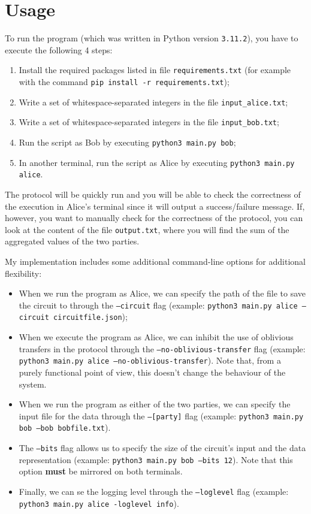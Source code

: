 \documentclass[12pt]{article}
\begin{document}
\section{Usage}\label{sec:running}

To run the program (which was written in Python version \texttt{3.11.2}), you have to execute the following 4 steps:

\begin{enumerate}
  \item Install the required packages listed in file \texttt{requirements.txt} (for example with the command \texttt{pip install -r requirements.txt});
  \item Write a set of whitespace-separated integers in the file \texttt{input\_alice.txt};
  \item Write a set of whitespace-separated integers in the file \texttt{input\_bob.txt};
  \item Run the script as Bob by executing \texttt{python3 main.py bob};
  \item In another terminal, run the script as Alice by executing \texttt{python3 main.py alice}.
\end{enumerate}

The protocol will be quickly run and you will be able to check the correctness of the execution in Alice's terminal since it will output a success/failure message. If, however, you want to manually check for the correctness of the protocol, you can look at the content of the file \texttt{output.txt}, where you will find the sum of the aggregated values of the two parties.

My implementation includes some additional command-line options for additional flexibility:

\begin{itemize}
  \item When we run the program as Alice, we can specify the path of the file to save the circuit to through the \texttt{--circuit} flag (example: \texttt{python3 main.py alice --circuit circuitfile.json});
  \item When we execute the program as Alice, we can inhibit the use of oblivious transfers in the protocol through the \texttt{--no-oblivious-transfer} flag (example: \texttt{python3 main.py alice --no-oblivious-transfer}). Note that, from a purely functional point of view, this doesn't change the behaviour of the system.
  \item When we run the program as either of the two parties, we can specify the input file for the data through the \texttt{--[party]} flag (example: \texttt{python3 main.py bob --bob bobfile.txt}).
  \item The \texttt{--bits} flag allows us to specify the size of the circuit's input and the data representation (example: \texttt{python3 main.py bob --bits 12}). Note that this option \textbf{must} be mirrored on both terminals.
  \item Finally, we can se the logging level through the \texttt{--loglevel} flag (example: \texttt{python3 main.py alice -loglevel info}).
\end{itemize}



\end{document}
